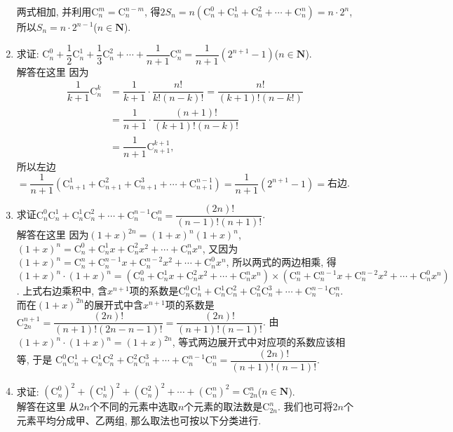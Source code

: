 \documentclass[10pt,a4paper]{article}
\begin{document}
\begin{enumerate}[1.]
两式相加, 并利用$\mathrm{C}_n^m=\mathrm{C}_n^{n-m}$, 得$2S_n=n(\mathrm{C}_n^0+\mathrm{C}_n^1+\mathrm{C}_n^2+\cdots +\mathrm{C}_n^n)=n\cdot 2^n$,
所以$S_n=n\cdot 2^{n-1}$($n\in \mathbf{N}$).
\item 求证: $\mathrm{C}_n^0+\dfrac 12\mathrm{C}_n^1+\dfrac 13\mathrm{C}_n^2+\cdots +\dfrac 1{n+1}\mathrm{C}_n^n=\dfrac 1{n+1}(2^{n+1}-1)$($n\in \mathbf{N}$).\\
解答在这里  因为
\begin{align*}\dfrac 1{k+1}\mathrm{C}_n^k&=\dfrac 1{k+1}\cdot \dfrac{n!}{k!(n-k)!}=\dfrac{n!}{(k+1)!(n-k!)}\\
&=\dfrac 1{n+1}\cdot \dfrac{(n+1)!}{(k+1)!(n-k)!}\\
&=\dfrac 1{n+1}\mathrm{C}_{n+1}^{k+1},\end{align*}
所以左边$=\dfrac 1{n+1}(\mathrm{C}_{n+1}^1+\mathrm{C}_{n+1}^2+\mathrm{C}_{n+1}^3+\cdots +\mathrm{C}_{n+1}^{n-1})=\dfrac 1{n+1}(2^{n+1}-1)=$右边.
\item 求证$\mathrm{C}_n^0\mathrm{C}_n^1+\mathrm{C}_n^1\mathrm{C}_n^2+\cdots +\mathrm{C}_n^{n-1}\mathrm{C}_n^n=\dfrac{(2n)!}{(n-1)!(n+1)!}$.\\
解答在这里  因为$(1+x)^{2n}=(1+x)^n(1+x)^n$, $(1+x)^n=\mathrm{C}_n^0+\mathrm{C}_n^1x+\mathrm{C}_n^2x^2+\cdots +\mathrm{C}_n^nx^n$,
又因为$(1+x)^n=\mathrm{C}_n^n+\mathrm{C}_n^{n-1}x+\mathrm{C}_n^{n-2}x^2+\cdots +\mathrm{C}_n^0x^n$,
所以两式的两边相乘, 得
$(1+x)^n\cdot (1+x)^n=(\mathrm{C}_n^0+\mathrm{C}_n^1x+\mathrm{C}_n^2x^2+\cdots +\mathrm{C}_n^nx^n)\times (\mathrm{C}_n^n+\mathrm{C}_n^{n-1}x+\mathrm{C}_n^{n-2}x^2+\cdots +\mathrm{C}_n^0x^n)$.
上式右边乘积中, 含$x^{n+1}$项的系数是$\mathrm{C}_n^0\mathrm{C}_n^1+\mathrm{C}_n^1\mathrm{C}_n^2+\mathrm{C}_n^2\mathrm{C}_n^3+\cdots +\mathrm{C}_n^{n-1}\mathrm{C}_n^n$.
而在$(1+x)^{2n}$的展开式中含$x^{n+1}$项的系数是
$\mathrm{C}_{2n}^{n+1}=\dfrac{(2n)!}{(n+1)!(2n-n-1)!}=\dfrac{(2n)!}{(n+1)!(n-1)!}$.
由$(1+x)^n\cdot (1+x)^n=(1+x)^{2n}$, 等式两边展开式中对应项的系数应该相等, 于是
$\mathrm{C}_n^0\mathrm{C}_n^1+\mathrm{C}_n^1\mathrm{C}_n^2+\mathrm{C}_n^2\mathrm{C}_n^3+\cdots +\mathrm{C}_n^{n-1}\mathrm{C}_n^n=\dfrac{(2n)!}{(n+1)!(n-1)!}$.
\item 求证: $(\mathrm{C}_n^0)^2+(\mathrm{C}_n^1)^2+(\mathrm{C}_n^2)^2+\cdots +(\mathrm{C}_n^n)^2=\mathrm{C}_{2n}^n$($n\in \mathbf{N}$).\\
解答在这里  从$2n$个不同的元素中选取$n$个元素的取法数是$\mathrm{C}_{2n}^n$. 我们也可将$2n$个元素平均分成甲、乙两组, 那么取法也可按以下分类进行.
\begin{center}
    \begin{tabular}{|c|c|c|}

\end{tabular}
\end{center}
\end{enumerate}
\end{document}
